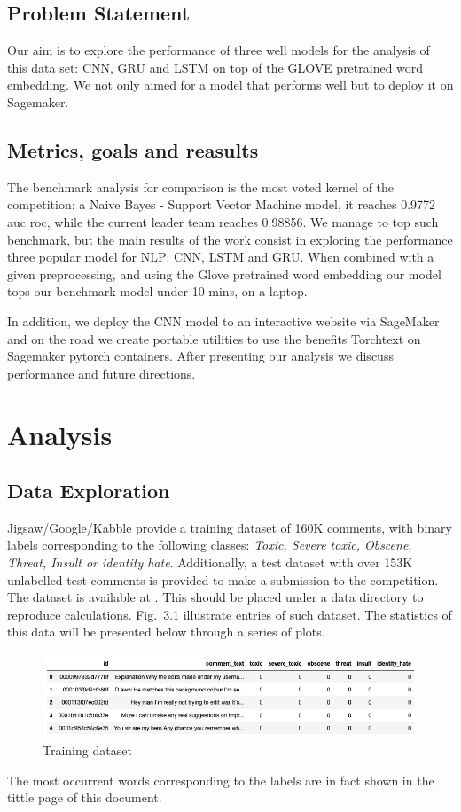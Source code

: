 \documentclass{report}
\begin{document}
\section{Problem Statement}

Our aim is to explore the performance of three well models for the analysis of
this data set: CNN, GRU and LSTM on top of the GLOVE pretrained word embedding. 
We not only aimed for a model that performs well but to deploy it  
on Sagemaker.

\section{Metrics, goals and reasults}

The benchmark analysis for comparison is the most voted
kernel of the competition: a Naive Bayes - Support Vector Machine model, it reaches 0.9772 auc roc,
while the current leader team reaches 0.98856. We manage to top such benchmark, but the main 
results of the work consist in exploring the performance three popular model for NLP:  CNN, LSTM and GRU.
When combined with a given preprocessing, and using the Glove pretrained word embedding our model tops 
our benchmark model under 10 mins, on a laptop.

In addition, we deploy the CNN model to an interactive website via SageMaker and on the road 
we create portable utilities to use the benefits Torchtext on Sagemaker pytorch containers. 
After presenting our analysis we discuss performance and future directions. 


\chapter{Analysis}


\section{Data Exploration}

 Jigsaw/Google/Kabble provide a training dataset  of 160K comments, with binary labels
 corresponding to the following classes:
 \emph{Toxic, Severe toxic, Obscene, Threat, Insult or  identity hate}.
 Additionally, a test dataset  with over 153K unlabelled  test comments is provided to make 
 a submission to the competition. The dataset is available at \cite{Kaggle}. This should be placed under a data
 directory to reproduce calculations. Fig.~\ref{fig:train_head} illustrate entries of 
 such dataset. The statistics of this data will be presented below through a series of plots. 
\begin{figure}[!h]
\centering
  \includegraphics[width=140mm]{../local/plots_tables/train_head.png}
  \caption{Training dataset}
  \label{fig:train_head}
\end{figure}
The most occurrent words corresponding to the labels are in fact shown in the tittle page of this document.
\end{document}

